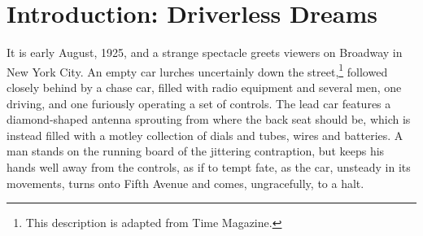 \chapter{Introduction: Driverless Dreams}
\label{chap:1}


It is early August, 1925, and a strange spectacle greets viewers on
Broadway in New York City. An empty car lurches uncertainly down the
street,\footnote{This description is adapted from Time
  Magazine\cite{???-Science-radio-auto}.} followed closely behind by a
chase car, filled with radio equipment and several men, one driving,
and one furiously operating a set of controls. The lead car features a
diamond-shaped antenna sprouting from where the back seat should be,
which is instead filled with a motley collection of dials and tubes,
wires and batteries. A man stands on the running board of the
jittering contraption, but keeps his
hands well away from the controls, as if to tempt fate, as the car,
unsteady in its movements, turns onto Fifth Avenue and comes,
ungracefully, to a halt.

